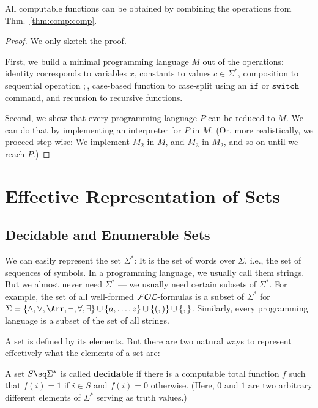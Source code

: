 \begin{theorem}\label{thm:comp:comp2}
All computable functions can be obtained by combining the operations from Thm.~\ref{thm:comp:comp}.
\end{theorem}
\begin{proof}
We only sketch the proof.

First, we build a minimal programming language $M$ out of the operations: identity corresponds to variables $x$, constants to values $c\in \Sigma^*$, composition to sequential operation $;$, case-based function to case-split using an $\mathtt{if}$ or $\mathtt{switch}$ command, and recursion to recursive functions.

Second, we show that every programming language $P$ can be reduced to $M$.
We can do that by implementing an interpreter for $P$ in $M$.
(Or, more realistically, we proceed step-wise: We implement $M_2$ in $M$, and $M_3$ in $M_2$, and so on until we reach $P$.)
\end{proof}


\section{Effective Representation of Sets}\label{sec:comp:dec}

\subsection{Decidable and Enumerable Sets}\label{sec:comp:data:def}

We can easily represent the set $\Sigma^*$: It is the set of words over $\Sigma$, i.e., the set of sequences of symbols.
In a programming language, we usually call them strings.
But we almost never need $\Sigma^*$ --- we usually need certain subsets of $\Sigma^*$.
For example, the set of all well-formed ${\mathcal{FOL}}$-formulas is a subset of $\Sigma^*$ for $\Sigma=\{\wedge,\vee,\impl,\neg,\forall,\exists\}\cup\{a,\ldots,z\}\cup\{(,)\}\cup\{,\}$.
Similarly, every programming language is a subset of the set of all strings.

A set is defined by its elements.
But there are two natural ways to represent effectively what the elements of a set are:

\begin{definition}\label{def:comp:dec}
A set $S\sq\Sigma^*$ is called \textbf{decidable} if there is a computable total function $f$ such that $f(i)=1$ if $i\in S$ and $f(i)=0$ otherwise.
(Here, $0$ and $1$ are two arbitrary different elements of $\Sigma^*$ serving as truth values.)
\end{definition}

